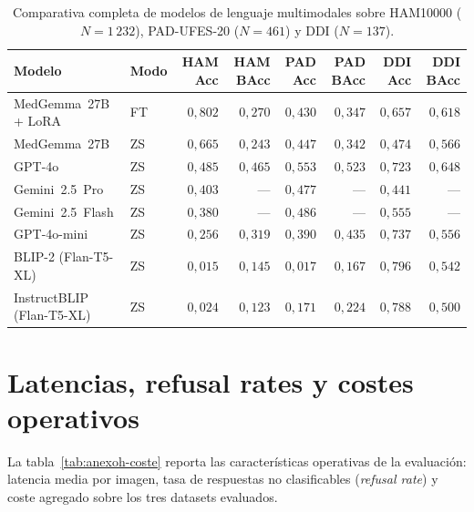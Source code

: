 \begin{table}[H]
\centering
\footnotesize
\setlength{\tabcolsep}{3pt}
\renewcommand{\arraystretch}{0.95}
\caption{Comparativa completa de modelos de lenguaje multimodales
sobre HAM10000 ($N = 1\,232$), PAD-UFES-20 ($N = 461$) y
DDI ($N = 137$).}
\label{tab:anexoh-completa}
\begin{tabular}{llrrrrrr}
\hline
Modelo                     & Modo  & HAM Acc       & HAM BAcc      & PAD Acc       & PAD BAcc      & DDI Acc       & DDI BAcc \\
\hline
MedGemma~27B + LoRA        & FT    & $0{,}802$     & $0{,}270$     & $0{,}430$     & $0{,}347$     & $0{,}657$     & $0{,}618$ \\
MedGemma~27B               & ZS    & $0{,}665$     & $0{,}243$     & $0{,}447$     & $0{,}342$     & $0{,}474$     & $0{,}566$ \\
GPT-4o                     & ZS    & $0{,}485$     & $0{,}465$     & $0{,}553$     & $0{,}523$     & $0{,}723$     & $0{,}648$ \\
Gemini~2.5~Pro             & ZS    & $0{,}403$     & ---           & $0{,}477$     & ---           & $0{,}441$     & --- \\
Gemini~2.5~Flash           & ZS    & $0{,}380$     & ---           & $0{,}486$     & ---           & $0{,}555$     & --- \\
GPT-4o-mini                & ZS    & $0{,}256$     & $0{,}319$     & $0{,}390$     & $0{,}435$     & $0{,}737$     & $0{,}556$ \\
BLIP-2 (Flan-T5-XL)        & ZS    & $0{,}015$     & $0{,}145$     & $0{,}017$     & $0{,}167$     & $0{,}796$     & $0{,}542$ \\
InstructBLIP (Flan-T5-XL)  & ZS    & $0{,}024$     & $0{,}123$     & $0{,}171$     & $0{,}224$     & $0{,}788$     & $0{,}500$ \\
\hline
\end{tabular}
\end{table}

\section{Latencias, refusal rates y costes operativos}
\label{sec:anexoh-coste}

La tabla~\ref{tab:anexoh-coste} reporta las características
operativas de la evaluación: latencia media por imagen, tasa de
respuestas no clasificables (\emph{refusal rate}) y coste agregado
sobre los tres datasets evaluados.

